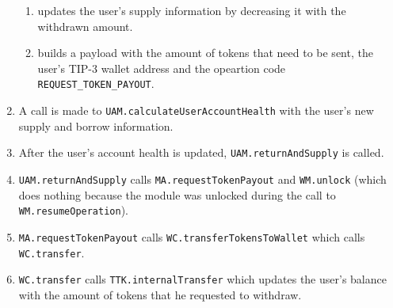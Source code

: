 \begin{enumerate}
\begin{enumerate}[label*=\arabic*.]
    \item updates the user's supply information by decreasing it with the withdrawn amount.
    \item builds a payload with the amount of tokens that need to be sent, the user's TIP-3 wallet address and the opeartion code \verb|REQUEST_TOKEN_PAYOUT|.
  \end{enumerate}
  \item A call is made to \verb|UAM.calculateUserAccountHealth| with the user's new supply and borrow information.
  \item After the user's account health is updated, \verb|UAM.returnAndSupply| is called.
  \item \verb|UAM.returnAndSupply| calls \verb|MA.requestTokenPayout| and \verb|WM.unlock| (which does nothing because the module was unlocked during the call to \verb|WM.resumeOperation|).
  \item \verb|MA.requestTokenPayout| calls \verb|WC.transferTokensToWallet| which calls \verb|WC.transfer|.
  \item \verb|WC.transfer| calls \verb|TTK.internalTransfer| which updates the user's balance with the amount of tokens that he requested to withdraw.
\end{enumerate}

